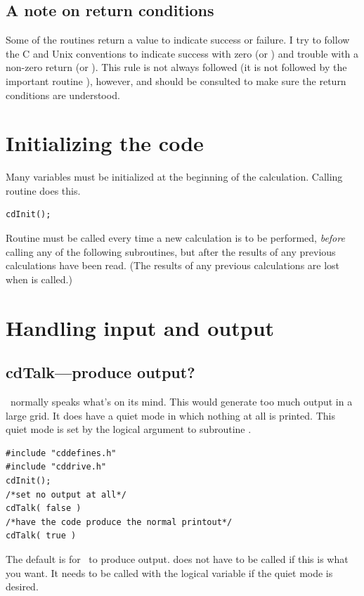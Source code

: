 \subsection{A note on return conditions}

Some of the routines return a value to indicate success or failure.
I try to follow the C and Unix conventions to indicate success with zero
(or ) and trouble with a non-zero return (or ).
This rule is not always followed (it
is not followed by the important routine ),
however, and 
should be consulted to make sure the return conditions are understood.

\section{Initializing the code}

Many variables must be initialized at the beginning of the calculation.
Calling routine  does this.
\begin{verbatim}
cdInit();
\end{verbatim}
Routine  must be called every time
a new calculation is to be
performed, \emph{before} calling any of the following subroutines,
but after the
results of any previous calculations have been read.
(The results of any
previous calculations are lost when  is called.)

\section{Handling input and output}

\subsection{cdTalk---produce output?}

\Cloudy\ normally speaks what's on its mind.
This would generate too much
output in a large grid.
It does have a quiet mode in which nothing at all
is printed.
This quiet mode is set by the logical argument to subroutine
.
\begin{verbatim}
#include "cddefines.h"
#include "cddrive.h"
cdInit();
/*set no output at all*/
cdTalk( false )
/*have the code produce the normal printout*/
cdTalk( true )
\end{verbatim}

The default is for \Cloudy\ to produce output.
 does not have to
be called if this is what you want.
It needs to be called with the logical
variable  if the quiet mode is desired.

